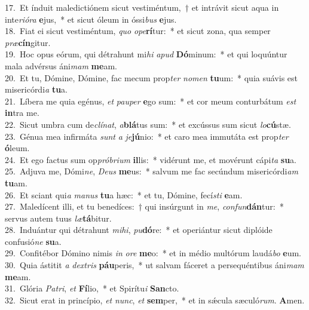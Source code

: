{17.~}Et índuit maledictiónem sicut vestiméntum,~† et intrávit sicut aqua in inte\textit{ri}\textit{ó}\textit{ra} \textbf{e}jus,~* et sicut óleum in óssi\textit{bus} \textbf{e}jus.\\
{18.~}Fiat ei sicut vestiméntum, \textit{quo} \textit{o}\textit{pe}\textbf{rí}tur:~* et sicut zona, qua semper \textit{præ}\textbf{cín}gitur.\\
{19.~}Hoc opus eórum, qui détrahunt mi\textit{hi} \textit{a}\textit{pud} \textbf{Dó}minum:~* et qui loquúntur mala advérsus áni\textit{mam} \textbf{me}am.\\
{20.~}Et tu, Dómine, Dómine, fac mecum prop\textit{ter} \textit{no}\textit{men} \textbf{tu}um:~* quia suávis est misericórdi\textit{a} \textbf{tu}a.\\
{21.~}Líbera me quia egénus, \textit{et} \textit{pau}\textit{per} \textbf{e}go sum:~* et cor meum conturbátum \textit{est} \textbf{in}tra me.\\
{22.~}Sicut umbra cum de\textit{clí}\textit{nat}, \textit{a}\textbf{blá}tus sum:~* et excússus sum sicut \textit{lo}\textbf{cú}stæ.\\
{23.~}Génua mea infirmáta \textit{sunt} \textit{a} \textit{je}\textbf{jú}nio:~* et caro mea immutáta est prop\textit{ter} \textbf{ó}leum.\\
{24.~}Et ego factus sum op\textit{pró}\textit{bri}\textit{um} \textbf{il}lis:~* vidérunt me, et movérunt cápi\textit{ta} \textbf{su}a.\\
{25.~}Adjuva me, Dómi\textit{ne}, \textit{De}\textit{us} \textbf{me}us:~* salvum me fac secúndum misericórdi\textit{am} \textbf{tu}am.\\
{26.~}Et sciant qui\textit{a} \textit{ma}\textit{nus} \textbf{tu}a hæc:~* et tu, Dómine, fecí\textit{sti} \textbf{e}am.\\
{27.~}Maledícent illi, et tu benedíces:~† qui insúrgunt in \textit{me}, \textit{con}\textit{fun}\textbf{dán}tur:~* servus autem tuus \textit{læ}\textbf{tá}bitur.\\
{28.~}Induántur qui détrahunt \textit{mi}\textit{hi}, \textit{pu}\textbf{dó}re:~* et operiántur sicut diplóide confusió\textit{ne} \textbf{su}a.\\
{29.~}Confitébor Dómino nimis \textit{in} \textit{o}\textit{re} \textbf{me}o:~* et in médio multórum laudá\textit{bo} \textbf{e}um.\\
{30.~}Quia ástitit \textit{a} \textit{dex}\textit{tris} \textbf{páu}peris,~* ut salvam fáceret a persequéntibus áni\textit{mam} \textbf{me}am.\\
{31.~}Glória \textit{Pa}\textit{tri}, \textit{et} \textbf{Fí}lio,~* et Spirítu\textit{i} \textbf{San}cto.\\
{32.~}Sicut erat in princípio, \textit{et} \textit{nunc}, \textit{et} \textbf{sem}per,~* et in sǽcula sæculó\textit{rum}. \textbf{A}men.\\

